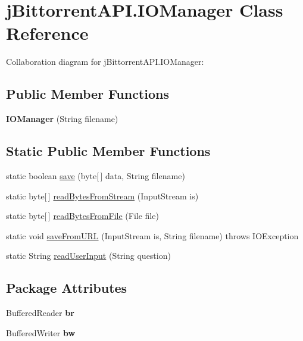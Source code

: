 \hypertarget{classj_bittorrent_a_p_i_1_1_i_o_manager}{
\section{jBittorrentAPI.IOManager Class Reference}
\label{classj_bittorrent_a_p_i_1_1_i_o_manager}
}
Collaboration diagram for jBittorrentAPI.IOManager:\subsection*{Public Member Functions}
\begin{DoxyCompactItemize}
\item 
\hypertarget{classj_bittorrent_a_p_i_1_1_i_o_manager_a72dddad087c24fc733008a84d3ede92c}{
{\bfseries IOManager} (String filename)}
\label{classj_bittorrent_a_p_i_1_1_i_o_manager_a72dddad087c24fc733008a84d3ede92c}

\end{DoxyCompactItemize}
\subsection*{Static Public Member Functions}
\begin{DoxyCompactItemize}
\item 
static boolean \hyperlink{classj_bittorrent_a_p_i_1_1_i_o_manager_aa6793b275ebb45b76d445296b0e296e9}{save} (byte\mbox{[}$\,$\mbox{]} data, String filename)
\item 
static byte\mbox{[}$\,$\mbox{]} \hyperlink{classj_bittorrent_a_p_i_1_1_i_o_manager_a5e79391798ed25d06a99845b7ea4a8c1}{readBytesFromStream} (InputStream is)
\item 
static byte\mbox{[}$\,$\mbox{]} \hyperlink{classj_bittorrent_a_p_i_1_1_i_o_manager_a65bcc486d524bd6d903d59ed0d8b7147}{readBytesFromFile} (File file)
\item 
static void \hyperlink{classj_bittorrent_a_p_i_1_1_i_o_manager_a5169f9bdb6f434a7bb3f83586b943a61}{saveFromURL} (InputStream is, String filename)  throws IOException 
\item 
static String \hyperlink{classj_bittorrent_a_p_i_1_1_i_o_manager_ae3ba74957fe0fb4a5087c35618e5cfc9}{readUserInput} (String question)
\end{DoxyCompactItemize}
\subsection*{Package Attributes}
\begin{DoxyCompactItemize}
\item 
\hypertarget{classj_bittorrent_a_p_i_1_1_i_o_manager_a3ac0db4ec39c9f72884465a8d5c101f7}{
BufferedReader {\bfseries br}}
\label{classj_bittorrent_a_p_i_1_1_i_o_manager_a3ac0db4ec39c9f72884465a8d5c101f7}

\item 
\hypertarget{classj_bittorrent_a_p_i_1_1_i_o_manager_a660502c41318b90ff6127db51eb24492}{
BufferedWriter {\bfseries bw}}
\label{classj_bittorrent_a_p_i_1_1_i_o_manager_a660502c41318b90ff6127db51eb24492}

\end{DoxyCompactItemize}


